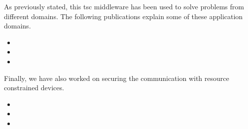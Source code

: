 \begin{sloppypar}
As previously stated, this \ac{tsc} middleware has been used to solve problems from different domains.
The following publications explain some of these application domains.
\begin{itemize}
 \item[] 
 \item[] 
 \item[] 
\end{itemize}


Finally, we have also worked on securing the communication with resource constrained devices.
\begin{itemize}
 \item[]  %
 \item[]  %
 \item[]  %
\end{itemize}

\end{sloppypar}